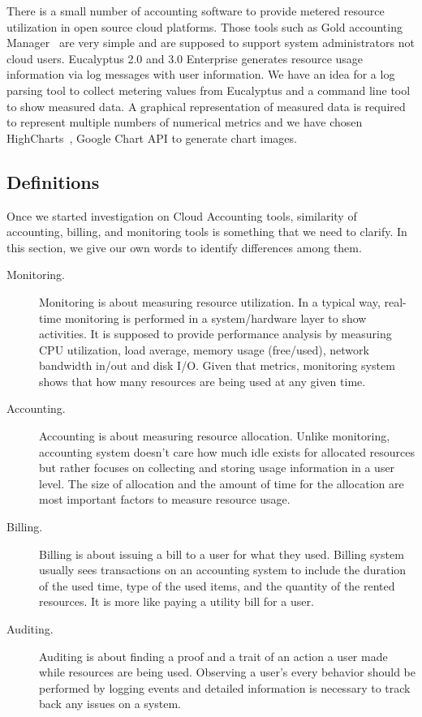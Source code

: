 \documentclass{sig-alternate-05-2015}
\begin{document}
There is a small number of accounting software to provide metered resource utilization in open source cloud platforms. Those tools such as Gold accounting Manager~\cite{jacksongold} are very simple and are supposed to support system administrators not cloud users. Eucalyptus 2.0 and 3.0 Enterprise generates resource usage information via log messages with user information. We have an idea for a log parsing tool to collect metering values from Eucalyptus and a command line tool to show measured data. A graphical representation of measured data is required to represent multiple numbers of numerical metrics and we have chosen HighCharts~\cite{highsoft2012highcharts}, Google Chart API to generate chart images.

\subsection{Definitions}

Once we started investigation on Cloud Accounting tools, similarity of accounting, billing, and monitoring tools is something that we need to clarify. In this section, we give our own words to identify differences among them. 

\begin{description}

\item[Monitoring.] Monitoring is about measuring resource utilization. In a typical way, real-time monitoring is performed in a system/hardware layer to show activities. It is supposed to provide performance analysis by measuring CPU utilization, load average, memory usage (free/used), network bandwidth in/out and disk I/O. Given that metrics, monitoring system shows that how many resources are being used at any given time. 

\item[Accounting.] Accounting is about measuring resource allocation. Unlike monitoring, accounting system doesn't care how much idle exists for allocated resources but rather focuses on collecting and storing usage information in a user level. The size of allocation and the amount of time for the allocation are most important factors to measure resource usage. 

\item[Billing.] Billing is about issuing a bill to a user for what they used. Billing system usually sees transactions on an accounting system to include the duration of the used time, type of the used items, and the quantity of the rented resources. It is more like paying a utility bill for a user. 

\item[Auditing.] Auditing is about finding a proof and a trait of an action a user made while resources are being used. Observing a user's every behavior should be performed by logging events and detailed information is necessary to track back any issues on a system. 

\end{description}
\end{document}
